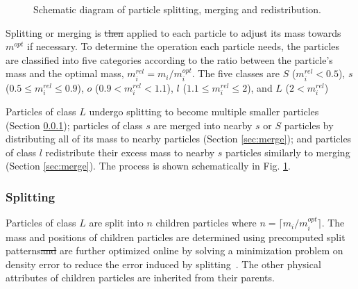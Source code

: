 \documentclass[VANCOUVER,STIX1COL]{WileyNJD-v2}
\providecommand{\DIFadd}[1]{{\protect\color{blue}\uwave{#1}}} %
\providecommand{\DIFdel}[1]{{\protect\color{red}\sout{#1}}}                      %
\providecommand{\DIFaddbegin}{} %
\providecommand{\DIFaddend}{} %
\providecommand{\DIFdelbegin}{} %
\providecommand{\DIFdelend}{} %
\providecommand{\DIFaddbeginFL}{} %
\providecommand{\DIFaddendFL}{} %
\providecommand{\DIFdelbeginFL}{} %
\providecommand{\DIFdelendFL}{} %
\begin{document}
\begin{figure}[b]
    \centering
    \DIFdelbeginFL %
\DIFdelendFL \DIFaddbeginFL {}
    \DIFaddendFL \vspace{-0.7\baselineskip}
    \caption{Schematic diagram of particle splitting, merging and redistribution.}
    \label{fig:split_schem}
\end{figure}

Splitting or merging is \DIFdelbegin \DIFdel{then }\DIFdelend applied to each particle to adjust its mass towards $m^{opt}$ if necessary. To determine the operation each particle needs, the particles are classified into five categories according to the ratio between the particle's mass and the optimal mass, $m_i^{rel} = m_i / m_i^{opt}$. The five classes are $S$ ($m_i^{rel} < 0.5$), $s$ ($0.5 \leq m_i^{rel} \leq 0.9$), $o$ ($0.9 < m_i^{rel} < 1.1$), $l$ ($1.1 \leq m_i^{rel} \leq 2$), and $L$ ($2 < m_i^{rel}$)

Particles of class $L$ undergo splitting to become multiple smaller particles (Section \ref{sec:split}); particles of class $s$  are merged into nearby $s$ or $S$ particles by distributing all of its mass to nearby particles (Section \ref{sec:merge}); and particles of class $l$ redistribute their excess mass to nearby $s$ particles similarly to merging (Section \ref{sec:merge}). The process is shown schematically in Fig. \ref{fig:split_schem}.

\subsubsection{Splitting}
\label{sec:split}
Particles of class $L$ are split into $n$ children particles where $n = \lceil m_i / m_i^{opt} \rceil$. The mass and positions of children particles are determined using precomputed split patterns\DIFdelbegin \DIFdel{and }\DIFdelend \DIFaddbegin \DIFadd{. They }\DIFaddend are further optimized online by solving a minimization problem on density error to reduce the error induced by splitting~\cite{Winchenbach21}. The other physical attributes of children particles are inherited from their parents.
\end{document}
